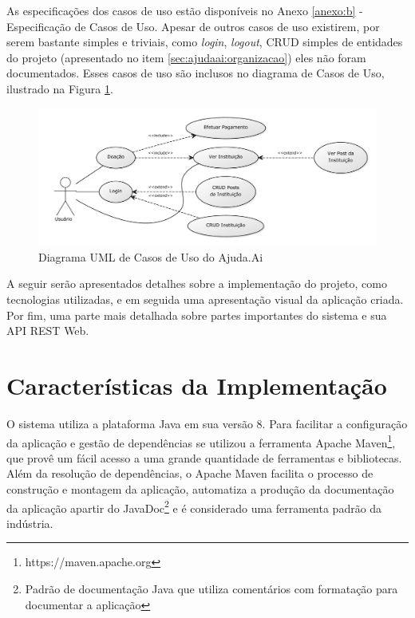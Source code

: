 As especificações dos casos de uso estão disponíveis no Anexo \ref{anexo:b} - Especificação de Casos de Uso. Apesar de outros casos de uso existirem, por serem bastante simples e triviais, como \emph{login}, \emph{logout}, CRUD simples de entidades do projeto  (apresentado no item \ref{sec:ajudaai:organizacao}) eles não foram documentados. Esses casos de uso são inclusos no diagrama de Casos de Uso, ilustrado na Figura \ref{fig:uml_caso_uso}.

\begin{figure}[H]
  \caption{\label{fig:uml_caso_uso}Diagrama UML de Casos de Uso do Ajuda.Ai}
  \centering
  \includegraphics[scale=0.46]{imagens/uml-casos-de-uso.pdf}
\end{figure}

A seguir serão apresentados detalhes sobre a implementação do projeto, como tecnologias utilizadas, e em seguida uma apresentação visual da aplicação criada. Por fim, uma parte mais detalhada sobre partes importantes do sistema e sua API REST Web.





\section{Características da Implementação} \label{sec:ajudaai:caracteristicas}

O sistema utiliza a plataforma Java em sua versão 8. Para facilitar a configuração da aplicação e gestão de dependências se utilizou a ferramenta Apache Maven\footnote{https://maven.apache.org}, que provê um fácil acesso a uma grande quantidade de ferramentas e bibliotecas. Além da resolução de dependências, o Apache Maven facilita o processo de construção e montagem da aplicação, automatiza a produção da documentação da aplicação apartir do JavaDoc\footnote{Padrão de documentação Java que utiliza comentários com formatação para documentar a aplicação} e é considerado uma ferramenta padrão da indústria.

